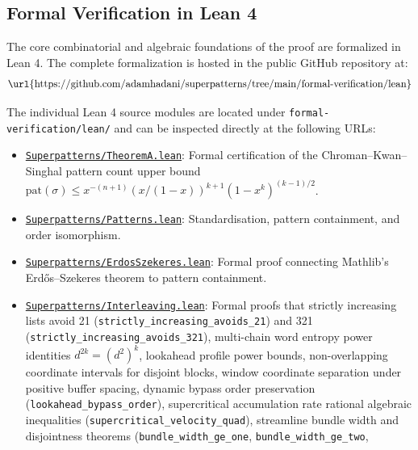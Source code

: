 \documentclass[
  11pt,
]{article}
\providecommand{\tightlist}{%
  \setlength{\itemsep}{0pt}\setlength{\parskip}{0pt}}
\begin{document}
\subsection{Formal Verification in Lean
4}\label{formal-verification-in-lean-4}

The core combinatorial and algebraic foundations of the proof are
formalized in Lean 4. The complete formalization is hosted in the public
GitHub repository at:
\[\text{\url{https://github.com/adamhadani/superpatterns/tree/main/formal-verification/lean}}\]

The individual Lean 4 source modules are located under
\texttt{formal-verification/lean/} and can be inspected directly at the
following URLs:

\begin{itemize}
\tightlist
\item
  \href{https://github.com/adamhadani/superpatterns/blob/main/formal-verification/lean/Superpatterns/TheoremA.lean}{\texttt{Superpatterns/TheoremA.lean}}:
  Formal certification of the Chroman--Kwan--Singhal pattern count upper
  bound \(\mathrm{pat}(\sigma) \le x^{-(n+1)}(x/(1-x))^{k+1}(1-x^k)^{(k-1)/2}\).
\item
  \href{https://github.com/adamhadani/superpatterns/blob/main/formal-verification/lean/Superpatterns/Patterns.lean}{\texttt{Superpatterns/Patterns.lean}}:
  Standardisation, pattern containment, and order isomorphism.
\item
  \href{https://github.com/adamhadani/superpatterns/blob/main/formal-verification/lean/Superpatterns/ErdosSzekeres.lean}{\texttt{Superpatterns/ErdosSzekeres.lean}}:
  Formal proof connecting Mathlib's Erdős--Szekeres theorem to pattern
  containment.
\item
  \href{https://github.com/adamhadani/superpatterns/blob/main/formal-verification/lean/Superpatterns/Interleaving.lean}{\texttt{Superpatterns/Interleaving.lean}}:
  Formal proofs that strictly increasing lists avoid 21
  (\texttt{strictly\_increasing\_avoids\_21}) and 321
  (\texttt{strictly\_increasing\_avoids\_321}), multi-chain word entropy
  power identities \(d^{2k} = (d^2)^k\), lookahead profile power bounds,
  non-overlapping coordinate intervals for disjoint blocks, window
  coordinate separation under positive buffer spacing, dynamic bypass
  order preservation (\texttt{lookahead\_bypass\_order}), supercritical
  accumulation rate rational algebraic inequalities
  (\texttt{supercritical\_velocity\_quad}), streamline bundle width and
  disjointness theorems (\texttt{bundle\_width\_ge\_one}, \texttt{bundle\_width\_ge\_two},

\end{itemize}
\end{document}
